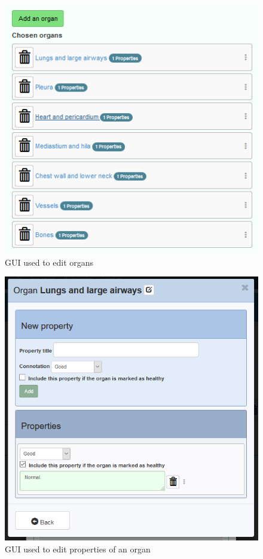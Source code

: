 \documentclass[12pt, twoside, openany]{report}
\theoremstyle{definition}
\begin{document}
\begin{figure}
    \centering
    \includegraphics{template-organs-list}
    \caption{GUI used to edit organs \label{fig:template-organs-list}}
\end{figure}

\begin{figure}
	  \begin{minipage}{\textwidth}
	\begin{center}
    \includegraphics{template-property-list}
    \caption{GUI used to edit properties of an organ\protect\footnotemark[2] \label{fig:template-property-list}}
    	\end{center}
    \end{minipage}
\end{figure}
\end{document}
